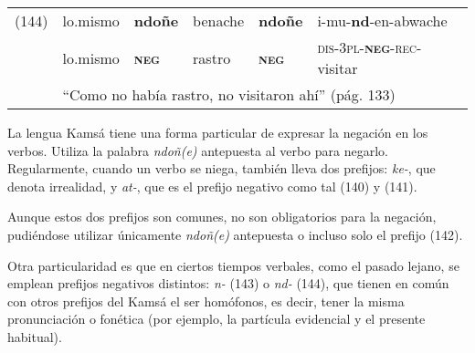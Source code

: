 {%
\begin{tabular}{llllll}
(144) & lo.mismo & \textbf{ndoñe} & benache & \textbf{ndoñe} & i-mu-\textbf{nd}-en-abwache \\
& lo.mismo & \textsc{\textbf{neg}} & rastro & \textsc{\textbf{neg}} & \textsc{dis-3pl-\textbf{neg}-rec-} visitar \\
& \multicolumn{5}{l}{``Como no había rastro, no visitaron ahí'' (pág. 133)}
\end{tabular} \vspace{0.5cm}

}

La lengua Kamsá tiene una forma particular de expresar la negación en los verbos. Utiliza la palabra {\setmainfont{Charis SIL} \textit{ndoñ(e)}} antepuesta al verbo para negarlo. Regularmente, cuando un verbo se niega, también lleva dos prefijos: {\setmainfont{Charis SIL} \textit{ke-}}, que denota irrealidad, y {\setmainfont{Charis SIL} \textit{at-}}, que es el prefijo negativo como tal (140) y (141).  

Aunque estos dos prefijos son comunes, no son obligatorios para la negación, pudiéndose utilizar únicamente {\setmainfont{Charis SIL} \textit{ndoñ(e)}} antepuesta \textcolor{MidnightBlue}{\citep{kamsa}} o incluso solo el prefijo (142).

Otra particularidad es que en ciertos tiempos verbales, como el pasado lejano, se emplean prefijos negativos distintos: {\setmainfont{Charis SIL} \textit{n-}} (143) o {\setmainfont{Charis SIL} \textit{nd-}} (144), que tienen en común con otros prefijos del Kamsá el ser homófonos, es decir, tener la misma pronunciación o fonética (por ejemplo, la partícula evidencial y el presente habitual).
